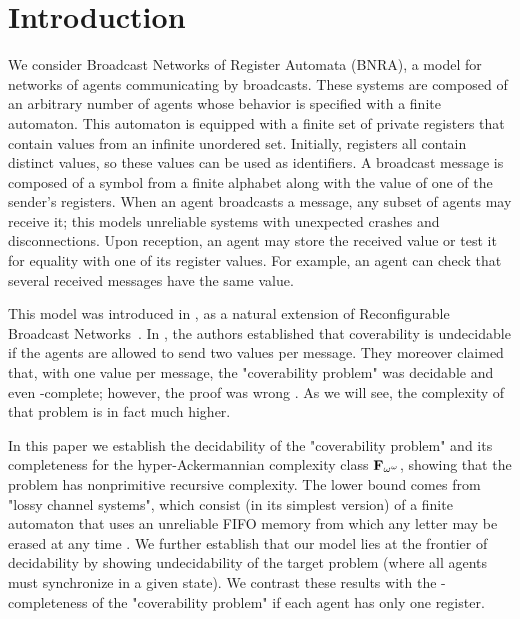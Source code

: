 \section{Introduction}
We consider Broadcast Networks of Register Automata (BNRA), a model for networks of agents communicating by broadcasts. These systems are composed of an arbitrary number of agents whose behavior is specified with a finite automaton. This automaton is equipped with a finite set of private registers that contain values from an infinite unordered set. Initially, registers all contain distinct values, so these values can be used as identifiers. 
A broadcast message is composed of a symbol from a finite alphabet along with the value of one of the sender's registers. When an agent broadcasts a message, any subset of agents may receive it; this models unreliable systems with unexpected crashes and disconnections. Upon reception, an agent may store the received value or test it for equality with one of its register values. For example, an agent can check that several received messages have the same value.

This model was introduced in \cite{DelzannoST13}, as a natural extension of Reconfigurable Broadcast Networks~\cite{DelzannoSZ2010Adhoc}. In \cite{DelzannoST13}, the authors established that coverability is undecidable if the agents are allowed to send two values per message. They moreover claimed that, with one value per message, the "coverability problem" was decidable and even \PSPACE-complete; however, the proof was wrong \cite{ArnaudErratum}. As we will see, the complexity of that problem is in fact much higher.

In this paper we establish the decidability of the "coverability problem" and its completeness for the hyper-Ackermannian complexity class $\mathbf{F}_{\omega^\omega}$, showing that the problem has nonprimitive recursive complexity. The lower bound comes from "lossy channel systems", which consist (in its simplest version) of a finite automaton that uses an unreliable FIFO memory from which any letter may be erased at any time \cite{AbdullaJ1996verif, Schnoebelen2002verifying,ChambartS08ordinal}. 
We further establish that our model lies at the frontier of decidability by showing undecidability of the target problem (where all agents must synchronize in a given state). We contrast these results with the \NP-completeness of the "coverability problem" if each agent has only one register. 

